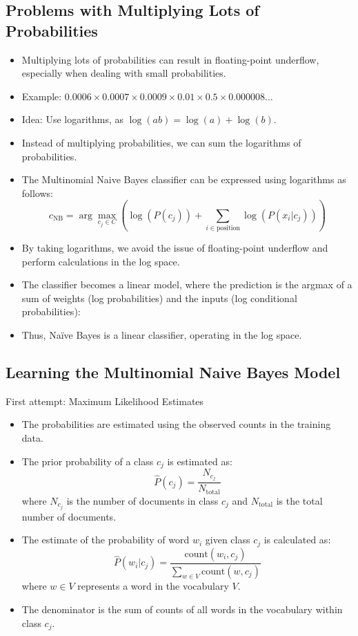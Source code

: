 \subsection{Problems with Multiplying Lots of Probabilities}
\begin{itemize}
    \item Multiplying lots of probabilities can result in floating-point underflow, especially when dealing with small probabilities.
    \item Example: $0.0006 \times 0.0007 \times 0.0009 \times 0.01 \times 0.5 \times 0.000008 \ldots$
    \item Idea: Use logarithms, as $\log(ab) = \log(a) + \log(b)$.
    \item Instead of multiplying probabilities, we can sum the logarithms of probabilities.
    \item The Multinomial Naive Bayes classifier can be expressed using logarithms as follows:
    \[
    c_{\text{NB}} = \arg\max_{c_j \in C} \left(\log(P(c_j)) + \sum_{i \in \text{position}} \log(P(x_i | c_j))\right)
    \]
    \item By taking logarithms, we avoid the issue of floating-point underflow and perform calculations in the log space.
     \item The classifier becomes a linear model, where the prediction is the argmax of a sum of weights (log probabilities) and the inputs (log conditional probabilities):
    \item Thus, Naïve Bayes is a linear classifier, operating in the log space.
    
    
\end{itemize}

\subsection{Learning the Multinomial Naive Bayes Model}
First attempt: Maximum Likelihood Estimates
\begin{itemize}
    \item The probabilities are estimated using the observed counts in the training data.
    \item The prior probability of a class $c_j$ is estimated as:
    \[
    \hat{P}(c_j) = \frac{N_{c_j}}{N_{\text{total}}}
    \]
    where $N_{c_j}$ is the number of documents in class $c_j$ and $N_{\text{total}}$ is the total number of documents.
    \item The estimate of the probability of word $w_i$ given class $c_j$ is calculated as:
    \[
    \hat{P}(w_i | c_j) = \frac{{\text{{count}}(w_i, c_j)}}{\sum_{w\in V}{\text{{count}}(w, c_j)}}
    \]
    where $w \in V$ represents a word in the vocabulary $V$.
    \item The denominator is the sum of counts of all words in the vocabulary within class $c_j$.
\end{itemize}


